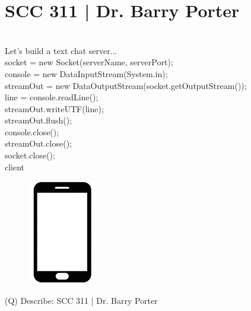 \documentclass[12pt]{article}
\begin{document}
\section{SCC 311 | Dr. Barry Porter}
\\
Let's build a text chat server...\\
socket    = new Socket(serverName, serverPort);\\
console   = new DataInputStream(System.in);\\
streamOut = new DataOutputStream(socket.getOutputStream());\\
line = console.readLine();\\
streamOut.writeUTF(line);\\
streamOut.flush();\\
console.close();\\
streamOut.close();\\
socket.close();\\
client\\
\begin{figure}[H]
\includegraphics[width=0.5\linewidth]{page6-image-1.png}
\end{figure}
\clearpage
(Q)
Describe: SCC 311 | Dr. Barry Porter
\clearpage
\end{document}
